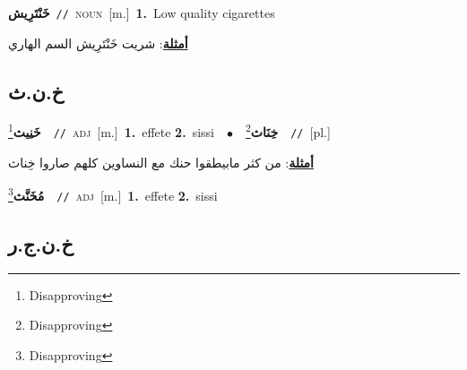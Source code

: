 \documentclass[10pt,a4paper,twoside]{article} %
\begin{document}
\begin{multicols}{2}
{\setlength\topsep{0pt}\textbf{\foreignlanguage{arabic}{خَنْتَرِيش}}\ {\color{gray}\texttt{//}\color{black}}\ \textsc{noun}\ [m.]\ \textbf{1.}~Low quality cigarettes\  \begin{flushright}\color{gray}\foreignlanguage{arabic}{\textbf{\underline{\foreignlanguage{arabic}{أمثلة}}}: شريت خَنْتَرِيش السم الهاري}\end{flushright}\color{black}} \vspace{2mm}

\vspace{-3mm}
\subsection*{\color{blue}\foreignlanguage{arabic}{خ.ن.ث}\color{blue}{}} 

{\setlength\topsep{0pt}\textbf{\foreignlanguage{arabic}{خَنِيث}}\footnote{Disapproving}\ \ {\color{gray}\texttt{//}\color{black}}\ \textsc{adj}\ [m.]\ \textbf{1.}~effete  \textbf{2.}~sissi\ \ $\bullet$\ \ \setlength\topsep{0pt}\textbf{\foreignlanguage{arabic}{خِنَاث}}\footnote{Disapproving}\ \ {\color{gray}\texttt{//}\color{black}}\ [pl.]\  \begin{flushright}\color{gray}\foreignlanguage{arabic}{\textbf{\underline{\foreignlanguage{arabic}{أمثلة}}}: من كثر مابيطقوا حنك مع النساوين كلهم صاروا خِناث}\end{flushright}\color{black}} \vspace{2mm}

{\setlength\topsep{0pt}\textbf{\foreignlanguage{arabic}{مُخَنَّث}}\footnote{Disapproving}\ \ {\color{gray}\texttt{//}\color{black}}\ \textsc{adj}\ [m.]\ \textbf{1.}~effete  \textbf{2.}~sissi\ } \vspace{2mm}

\vspace{-3mm}
\subsection*{\color{blue}\foreignlanguage{arabic}{خ.ن.ج.ر}\color{blue}{}} 


\end{multicols}
\end{document}
